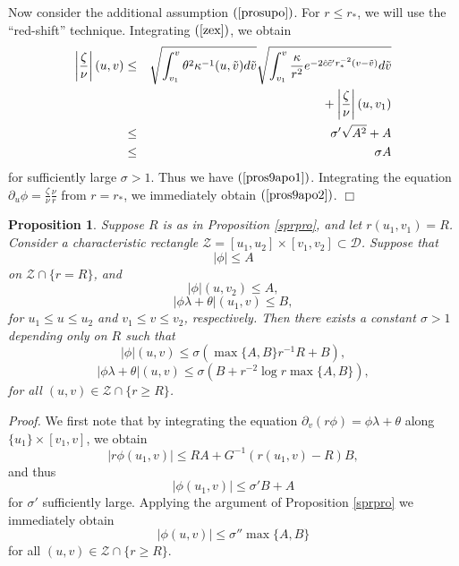 \documentclass{article}
\newtheorem{proposition}{Proposition}[section]
\newcommand{\zn}{\frac{\zeta}{\nu}}
\begin{document}
Now consider the additional assumption $(\ref{prosupo})$. For $r\le r_*$,
we will use the ``red-shift'' technique. Integrating $(\ref{zex})$, we obtain
\begin{eqnarray*}
\left|\zn\right|(u,v)	&\le&	\sqrt{\int_{v_1}^{v}\theta^2\kappa^{-1}(u,\tilde{v})
						d\tilde{v}}\sqrt
					{\int_{v_1}^v{
					\frac{\kappa}{r^2}e^{-2\hat{c}\tilde{c}'r_*^{-2}
					(v-\tilde{v})}d\tilde{v}}}\\
			&   &	\hbox{\ \ }+\left|\zn\right|(u,v_1)\\
			&\le&	\sigma'\sqrt{A^2}+A\\
			&\le&	\sigma A
\end{eqnarray*}	
for sufficiently large $\sigma>1$. 
Thus we have $(\ref{pros9apo1})$. Integrating the equation
$\partial_u\phi=\zn\frac{\nu}r$ from $r=r_*$,
we immediately obtain $(\ref{pros9apo2})$.
$\Box$

\begin{proposition}
\label{arketamegaln}
Suppose $R$ is as in Proposition \ref{sprpro}, 
and let $r(u_1,v_1)=R$.
Consider a characteristic rectangle $\mathcal{Z}=[u_1,u_2]\times[v_1,v_2]\subset
\mathcal{D}$.
Suppose that 
\[
|\phi|\le A
\]
on $\mathcal{Z}\cap\{r=R\}$, and 
\[
|\phi|(u,v_2)\le A,
\]
\[
|\phi\lambda+\theta|(u_1,v)\le B,
\]
for $u_1\le u\le u_2$ and $v_1\le v\le v_2$, respectively. 
Then there exists a constant $\sigma>1$ depending only on
$R$ such that
\begin{equation}
\label{evakap}
|\phi|(u,v)\le\sigma\left(\max\{A,B\}r^{-1}R+B\right),
\end{equation}
\begin{equation}
\label{evakap2}
|\phi\lambda+\theta|(u,v)\le\sigma\left(B+r^{-2}\log r\max\{A,B\}\right),
\end{equation}
for all $(u,v)\in\mathcal{Z}\cap\{r\ge R\}$.
\end{proposition}

\noindent\emph{Proof.}
We first note that by integrating the equation $\partial_v(r\phi)=\phi\lambda+\theta$
along $\{u_1\}\times[v_1,v]$, we obtain
\[
|r\phi(u_1,v)|\le RA+G^{-1}(r(u_1,v)-R)B,
\]
and thus
\[
|\phi(u_1,v)|\le \sigma'B+A
\]
for $\sigma'$ sufficiently large.
Applying the argument of Proposition \ref{sprpro}
we immediately obtain
\begin{equation}
\label{GT}
|\phi(u,v)|\le \sigma''\max\{A,B\}
\end{equation}
for all $(u,v)\in\mathcal{Z}\cap\{r\ge R\}$.
\end{document}

